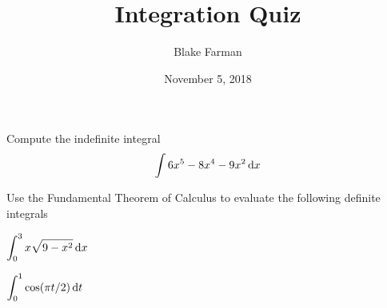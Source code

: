\documentclass[10pt]{amsart}
\title{Integration Quiz}
\date{November 5, 2018}
\author{Blake Farman}
\begin{document}
\maketitle

\makenameslot

\begin{thm}
  Compute the indefinite integral
  \[\int 6x^5 - 8x^4 - 9x^2 \dif x\]
\end{thm}

\vspace{1in}

Use the Fundamental Theorem of Calculus to evaluate the following definite integrals
\begin{multicols}{2}
  \begin{thm}
    \(\displaystyle{\int_0^3 x\sqrt{9 - x^2}\dif x}\)
  \end{thm}
  \begin{thm}
    \(\displaystyle{\int_0^1\cos(\pi t/2)\dif t}\)
  \end{thm}
\end{multicols}
\end{document}
